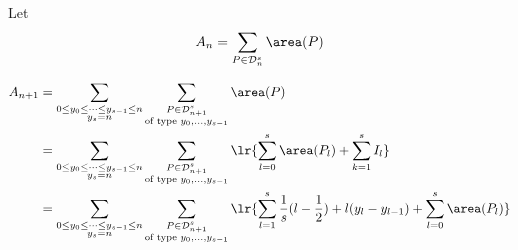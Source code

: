\documentclass[12pt]{article}
\begin{document}
Let 
\[
    A_{n} = \sum_{P\in \mathcal{D}_{n}^{s}} \area(P)
\]

\begin{align}\label{eq:bigrec}
    A_{n+1} &= \sum_{\substack{0\leq y_{0}\leq \cdots\leq y_{s-1}\leq n\\y_{s}=n}} \sum_{\substack{P\in \mathcal{D}_{n+1}^{s}\\\text{of type }y_{0},\ldots, y_{s-1}}} \area(P)\nonumber \\
    &= \sum_{\substack{0\leq y_{0}\leq \cdots\leq y_{s-1}\leq n\\y_{s}=n}} \sum_{\substack{P\in \mathcal{D}_{n+1}^{s}\\\text{of type }y_{0},\ldots, y_{s-1}}} \lr{\sum_{l=0}^{s}\area(P_{l}) + \sum_{k=1}^{s}I_{l}} \nonumber \\
    &= \sum_{\substack{0\leq y_{0}\leq \cdots\leq y_{s-1}\leq n\\y_{s}=n}} \sum_{\substack{P\in \mathcal{D}_{n+1}^{s}\\\text{of type }y_{0},\ldots, y_{s-1}}} \lr{\sum_{l=1}^{s}\frac{1}{s}(l-\frac{1}{2}) +l(y_{l}-y_{l-1}) + \sum_{l=0}^{s}\area(P_{l})}  
\end{align}
\end{document}
